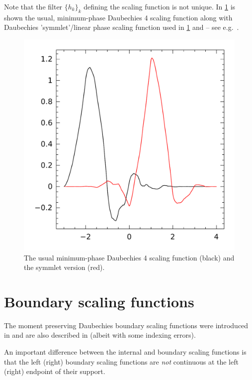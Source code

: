 \documentclass[a4paper]{scrartcl}
\begin{document}
Note that the filter $\{h_k\}_k$ defining the scaling function is not unique.
In \cref{fig:Daubechies4} is shown the usual, minimum-phase Daubechies 4 scaling function along with Daubechies 'symmlet'/linear phase scaling function used in \cref{sec:boundary_Daubechies} and \cite{Cohen:Daubechies:Vial:1993} -- see e.g.\ \cite[Section 7.2.3]{Mallat:2009}.

\begin{figure}
	\centering
	\includegraphics[scale=0.5]{interior}
	\caption{The usual minimum-phase Daubechies 4 scaling function (black) and the symmlet version (red).}
	\label{fig:Daubechies4}
\end{figure}


\section{Boundary scaling functions}
\label{sec:boundary_Daubechies}

The moment preserving Daubechies boundary scaling functions were introduced in \cite{Cohen:Daubechies:Vial:1993} and are also described in \cite{Mallat:2009} (albeit with some indexing errors).

An important difference between the internal and boundary scaling functions is that the left (right) boundary scaling functions are \emph{not} continuous at the left (right) endpoint of their support.
\end{document}
